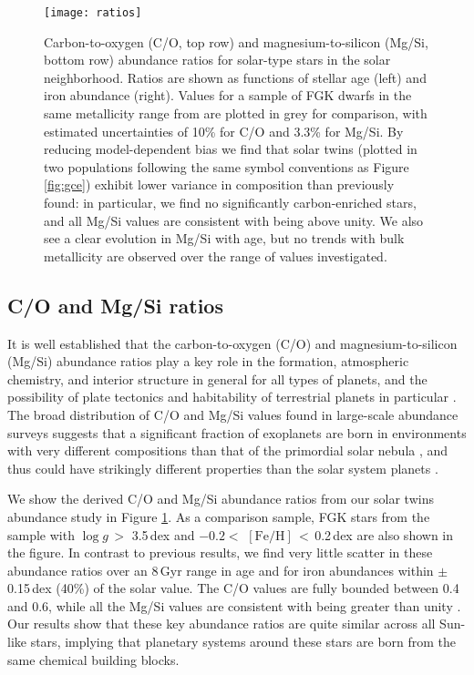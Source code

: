 \documentclass[twocolumn]{aastex62}
\newcommand{\logg}{$\log g$}
\newcommand{\feh}{$\mathrm{[Fe/H]}$}
\begin{document}
\begin{figure}
\centering
\texttt{[image: ratios]}
\caption{Carbon-to-oxygen (C/O, top row) and magnesium-to-silicon (Mg/Si, bottom row) abundance ratios for solar-type stars in the solar neighborhood. Ratios are shown as functions of stellar age (left) and iron abundance (right). Values for a sample of FGK dwarfs in the same metallicity range from \citet{brewer16} are plotted in grey for comparison, with estimated uncertainties of 10\% for C/O and 3.3\% for Mg/Si. By reducing model-dependent bias we find that solar twins (plotted in two populations following the same symbol conventions as Figure \ref{fig:gce}) exhibit lower variance in composition than previously found: in particular, we find no significantly carbon-enriched stars, and all Mg/Si values are consistent with being above unity. We also see a clear evolution in Mg/Si with age, but no trends with bulk metallicity are observed over the range of values investigated.}
\label{fig:ratios}
\end{figure}

\subsection{C/O and Mg/Si ratios}

It is well established that the carbon-to-oxygen (C/O) and magnesium-to-silicon (Mg/Si) abundance ratios play a key role in the formation, atmospheric chemistry, and interior structure in general for all types of planets, and the possibility of plate tectonics and habitability of terrestrial planets in particular \citep{kuchner05, madhu11, oberg11, unterborn14, unterborn17a}.
The broad distribution of C/O and Mg/Si values found in large-scale abundance surveys suggests that a significant fraction of exoplanets are born in environments with very different compositions than that of the primordial solar nebula \citep{delgado10, petigura11, adibekyan12, bensby14, brewer16}, and thus could have strikingly different properties than the solar system planets \citep{bond10, carter-bond12, unterborn17b}. 

We show the derived C/O and Mg/Si abundance ratios from our solar twins abundance study in Figure \ref{fig:ratios}. 
As a comparison sample, FGK stars from the \citet{brewer16} sample with \logg\,$>$ 3.5\,dex and $-0.2 <$ \feh\,$<$\,0.2\,dex are also shown in the figure.
In contrast to previous results, we find very little scatter in these abundance ratios over an 8\,Gyr range in age and for iron abundances within $\pm$0.15\,dex (40\%) of the solar value. 
The C/O values are fully bounded between 0.4 and 0.6, while all the Mg/Si values are consistent with being greater than unity \citep[compare to the solar values of 0.54 and 1.05 respectively][]{asplund09}.
Our results show that these key abundance ratios are quite similar across all Sun-like stars, implying that planetary systems around these stars are born from the same chemical building blocks.
\end{document}

